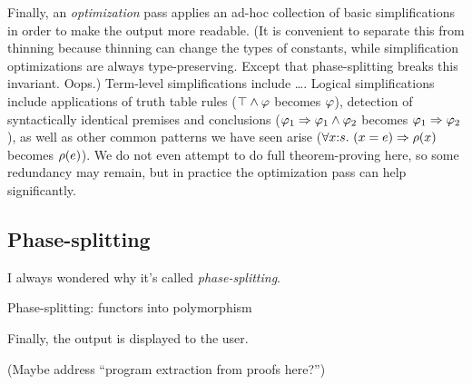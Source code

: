 Finally, an \emph{optimization} pass applies an ad-hoc collection of basic simplifications in order to make the output more readable.  (It is convenient to separate this from thinning because thinning can change the types of constants, while simplification optimizations are always type-preserving.  Except that phase-splitting breaks this invariant.  Oops.)  Term-level simplifications include \ldots.
Logical simplifications include applications of truth table rules ($\top\land \varphi$ becomes $\varphi$), detection of syntactically identical premises and conclusions ($\varphi_1\Rightarrow \varphi_1\land \varphi_2$ becomes $\varphi_1\Rightarrow \varphi_2$), as well as other common patterns we have seen arise
($\forall x{:}s.\ (x = e)\Rightarrow \rho(x)$ becomes $\rho(e)$).  We do not even attempt to do full theorem-proving here, so some redundancy may remain, but in practice the optimization pass can help significantly.

\subsection{Phase-splitting}
\label{sec:phase-splitting}

I always wondered why it's called \emph{phase-splitting}.

Phase-splitting:  functors into polymorphism


Finally, the output is displayed to the user.

\label{sec:typechecking}
(Maybe address
``program extraction from proofs here?'')





